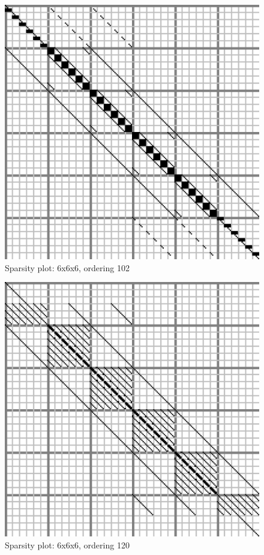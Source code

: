 \documentclass[10pt]{article}
\begin{document}
\begin{multicols}{2}
\begin{figure}[H]
	\centering
	\includegraphics[width=\spwidth]{../img/sparsity/int_hq_6x6x6_102.png}
	\caption{Sparsity plot: 6x6x6, ordering 102 }
\end{figure}

\begin{figure}[H]
	\centering
	\includegraphics[width=\spwidth]{../img/sparsity/int_hq_6x6x6_120.png}
	\caption{Sparsity plot: 6x6x6, ordering 120 }
\end{figure}


\end{multicols}
\end{document}
